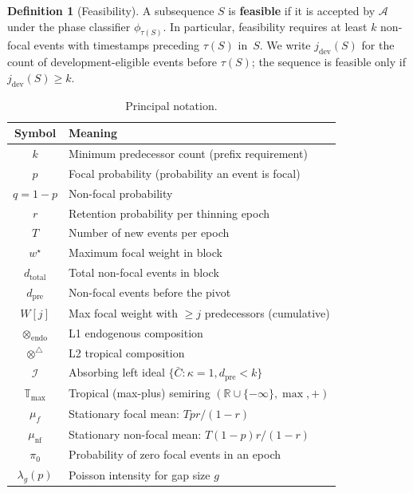 \documentclass[11pt]{article}
\theoremstyle{plain}
\theoremstyle{definition}
\newtheorem{definition}[theorem]{Definition}
\theoremstyle{remark}
\newcommand{\R}{\mathbb{R}}
\newcommand{\opendo}{\otimes_{\mathrm{endo}}}
\newcommand{\optrop}{\otimes^{\triangle}}
\newcommand{\wstar}{{w^{\star}}}
\newcommand{\dtotal}{{d_{\mathrm{total}}}}
\newcommand{\dpre}[1][]{d_{\mathrm{pre}#1}}
\newcommand{\jdev}{{j_{\mathrm{dev}}}}
\newcommand{\Tmax}{\mathbb{T}_{\max}}
\begin{document}
\begin{definition}[Feasibility]\label{def:feasibility}
A subsequence $S$ is \textbf{feasible} if it is accepted by
$\mathcal{A}$ under the phase classifier $\phi_{\tau(S)}$.  In
particular, feasibility requires at least $k$ non-focal events with
timestamps preceding $\tau(S)$ in~$S$.  We write $\jdev(S)$ for the
count of development-eligible events before $\tau(S)$; the
sequence is feasible only if $\jdev(S) \ge k$.
\end{definition}

\begin{table}[t]
\centering
\caption{Principal notation.}\label{tab:notation}
\small
\begin{tabular}{@{}cl@{}}
\toprule
\textbf{Symbol} & \textbf{Meaning} \\
\midrule
$k$ & Minimum predecessor count (prefix requirement) \\
$p$ & Focal probability (probability an event is focal) \\
$q = 1-p$ & Non-focal probability \\
$r$ & Retention probability per thinning epoch \\
$T$ & Number of new events per epoch \\
$\wstar$ & Maximum focal weight in block \\
$\dtotal$ & Total non-focal events in block \\
$\dpre$ & Non-focal events before the pivot \\
$W[j]$ & Max focal weight with $\ge j$ predecessors (cumulative) \\
$\opendo$ & L1 endogenous composition \\
$\optrop$ & L2 tropical composition \\
$\mathcal{I}$ & Absorbing left ideal $\{\bar{C}: \kappa=1, \dpre < k\}$ \\
$\Tmax$ & Tropical (max-plus) semiring $(\R \cup \{-\infty\}, \max, +)$ \\
$\mu_f$ & Stationary focal mean: $Tpr/(1-r)$ \\
$\mu_{\mathrm{nf}}$ & Stationary non-focal mean: $T(1-p)r/(1-r)$ \\
$\pi_0$ & Probability of zero focal events in an epoch \\
$\lambda_g(p)$ & Poisson intensity for gap size $g$ \\
\bottomrule
\end{tabular}
\end{table}

\end{document}

